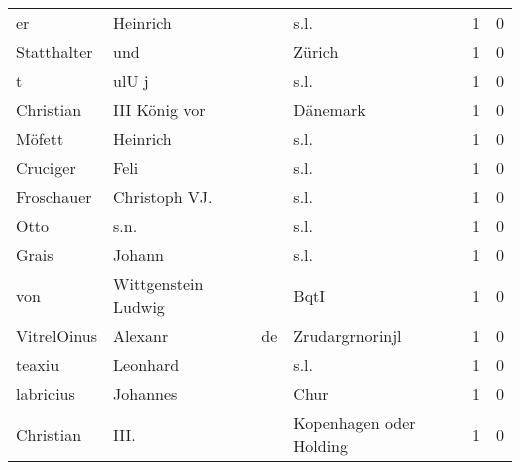 \documentclass[10pt,a4paper,landscape]{article}
\begin{document}
\begin{longtable}{llllrr}
                       er &                           Heinrich &             &                                        s.l. &          1 &         0 \\
              Statthalter &                                und &             &                                      Zürich &          1 &         0 \\
                        t &                              ulU j &             &                                        s.l. &          1 &         0 \\
                Christian &                      III König vor &             &                                    Dänemark &          1 &         0 \\
                   Möfett &                           Heinrich &             &                                        s.l. &          1 &         0 \\
                 Cruciger &                               Feli &             &                                        s.l. &          1 &         0 \\
               Froschauer &                      Christoph VJ. &             &                                        s.l. &          1 &         0 \\
                     Otto &                               s.n. &             &                                        s.l. &          1 &         0 \\
                    Grais &                             Johann &             &                                        s.l. &          1 &         0 \\
                      von &                Wittgenstein Ludwig &             &                                        BqtI &          1 &         0 \\
              VitrelOinus &                            Alexanr &          de &                             Zrudargrnorinjl &          1 &         0 \\
                   teaxiu &                           Leonhard &             &                                        s.l. &          1 &         0 \\
                labricius &                           Johannes &             &                                        Chur &          1 &         0 \\
                Christian &                               III. &             &                     Kopenhagen oder Holding &          1 &         0 \\

\end{longtable}
\end{document}
